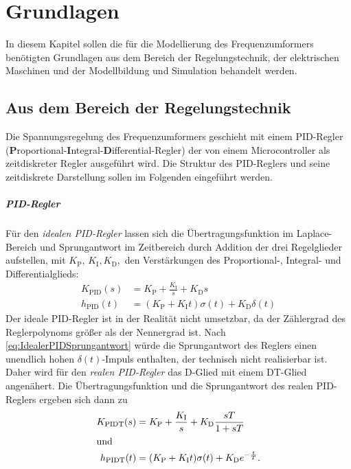 \chapter{Grundlagen}
\label{chap:Grundlagen}
In diesem Kapitel sollen die für die Modellierung des Frequenzumformers benötigten Grundlagen aus dem Bereich der Regelungstechnik, der elektrischen Maschinen und der Modellbildung und Simulation  behandelt werden. 

\section{Aus dem Bereich der Regelungstechnik}
\label{sec:GrundlagenRegelungstechnik}
Die Spannungsregelung des Frequenzumformers geschieht mit einem PID-Regler (\textbf{P}ro\-por\-ti\-o\-nal-\textbf{I}ntegral-\textbf{D}ifferential-Regler) der von einem Microcontroller als zeitdiskreter Regler ausgeführt wird. Die Struktur des PID-Reglers und seine zeitdiskrete Darstellung sollen im Folgenden eingeführt werden.

\paragraph{PID-Regler}
\label{par:PID-Regler}
Für den \emph{idealen PID-Regler} lassen sich die Übertragungsfunktion im Laplace-Bereich und Sprungantwort im Zeitbereich durch Addition der drei Regelglieder aufstellen, mit $K_{\mathrm{P}},\,K_{\mathrm{I}},K_{\mathrm{D}},$ den Verstärkungen des Proportional-, Integral- und Differentialglieds:
\begin{align}
    K_{\mathrm{PID}}(s) &= K_{\mathrm{P}} + \frac{K_{\mathrm{I}}}{s} + K_{\mathrm{D}}s \label{eq:IdealerPID} \\
    h_{\mathrm{PID}}(t) &= (K_{\mathrm{P}} + K_{\mathrm{I}}t)\sigma(t) + K_{\mathrm{D}}\delta(t) \label{eq:IdealerPIDSprungantwort}
\end{align}
Der ideale PID-Regler ist in der Realität nicht umsetzbar, da der Zählergrad des Reglerpolynoms größer als der Nennergrad ist. Nach \cref{eq:IdealerPIDSprungantwort} würde die Sprungantwort des Reglers einen unendlich hohen $\delta(t)$-Impuls enthalten, der technisch nicht realisierbar ist. Daher wird für den \emph{realen PID-Regler} das D-Glied mit einem DT-Glied angenähert. Die Übertragungsfunktion und die Sprungantwort des realen PID-Reglers ergeben sich dann zu\begin{align}
    K_{\mathrm{PIDT}}(s) &= K_{\mathrm{P}} + \frac{K_{\mathrm{I}}}{s} + K_{\mathrm{D}}\frac{sT}{1+sT} \label{eq:realerPID} \\
    \intertext{und}
    h_{\mathrm{PIDT}}(t) &= (K_{\mathrm{P}} + K_{\mathrm{I}}t)\sigma(t) + K_{\mathrm{D}} e^{-\frac t T}.
\end{align}
